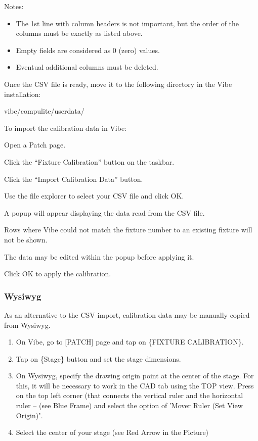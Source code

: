 \documentclass[
]{article}
\begin{document}
Notes:

\begin{itemize}
\item
  The 1st line with column headers is not important, but the order of the columns must be exactly as listed above.
\item
  Empty fields are considered as 0 (zero) values.
\item
  Eventual additional columns must be deleted.
\end{itemize}

Once the CSV file is ready, move it to the following directory in the Vibe installation:

vibe/compulite/userdata/

To import the calibration data in Vibe:

Open a Patch page.

Click the ``Fixture Calibration'' button on the taskbar.

Click the ``Import Calibration Data'' button.

Use the file explorer to select your CSV file and click OK.

A popup will appear displaying the data read from the CSV file.

Rows where Vibe could not match the fixture number to an existing fixture will not be shown.

The data may be edited within the popup before applying it.

Click OK to apply the calibration.

\hypertarget{wysiwyg}{%
\subsubsection{Wysiwyg}\label{wysiwyg}}

As an alternative to the CSV import, calibration data may be manually copied from Wysiwyg.

\begin{enumerate}
\def\labelenumi{\arabic{enumi}.}
\item
  On Vibe, go to {[}PATCH{]} page and tap on \{FIXTURE CALIBRATION\}.
\item
  Tap on \{Stage\} button and set the stage dimensions.
\item
  On Wysiwyg, specify the drawing origin point at the center of the stage. For this, it will be necessary to work in the CAD tab using the TOP view. Press on the top left corner (that connects the vertical ruler and the horizontal ruler -- (see {Blue Frame}) and select the option of 'Mover Ruler (Set View Origin)ʼ.
\item
  Select the center of your stage (see {Red Arrow} in the Picture)
\end{enumerate}
\end{document}
